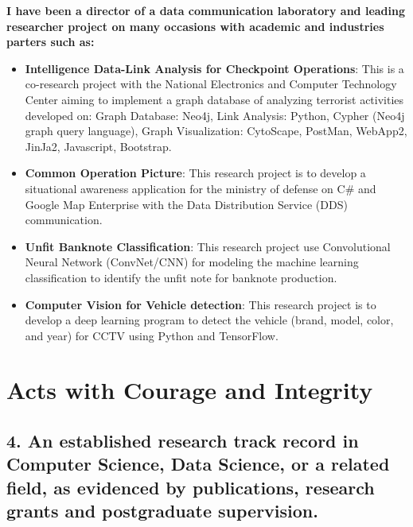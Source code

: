 \documentclass[12pt]{article}
\begin{document}
{\bfseries I have been a director of a data communication laboratory and leading researcher project on many occasions with academic and industries parters such as:}
\begin{itemize}
    \item \textbf{Intelligence Data-Link Analysis for Checkpoint Operations}: This is a  co-research project with the National Electronics and Computer Technology Center aiming to implement a graph database of analyzing terrorist activities developed on: Graph Database: Neo4j, Link Analysis: Python, Cypher (Neo4j graph query language), Graph Visualization: CytoScape, PostMan, WebApp2, JinJa2, Javascript, Bootstrap.
    \item \textbf{Common Operation Picture}: This research project is to develop a situational awareness application for the ministry of defense on C\# and Google Map Enterprise with the Data Distribution Service (DDS) communication.
    \item \textbf{Unfit Banknote Classification}: This research project use Convolutional Neural Network (ConvNet/CNN) for modeling the machine learning classification to identify the unfit note for banknote production.
    \item \textbf{Computer Vision for Vehicle detection}: This research project is to develop a deep learning program to detect the vehicle (brand, model, color, and year) for CCTV using Python and TensorFlow.
\end{itemize}


\section*{Acts with Courage and Integrity}
\subsection*{4. An established research track record in Computer Science, Data Science, or a related field, as evidenced by publications, research grants and postgraduate supervision.}
\end{document}
